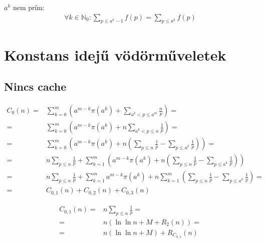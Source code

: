 \documentclass{article}
\begin{document}
$a^k$ nem prím:
\begin{align*}
\forall k \in \mathbb{N}_0 : \sum_{p \le a^k - 1} f(p) =\sum_{p \le a^k} f(p)
\end{align*}

\section{Konstans idejű vödörműveletek}

\subsection{Nincs cache}

\begin{align*}
C_0(n) =& \sum_{k=0}^{m} \left( a^{m-k} \pi(a^k) + \sum_{a^k < p \le a^m} \frac{n}{p} \right) = \\
=& \sum_{k=0}^{m} \left( a^{m-k} \pi(a^k) + n \sum_{a^k < p \le n} \frac{1}{p} \right) = \\
=& \sum_{k=0}^{m} \left( a^{m-k} \pi(a^k) + n \left( \sum_{p \le n} \frac{1}{p} - \sum_{p \le a^k} \frac{1}{p} \right) \right) = \\
=& n \sum_{p \le n} \frac{1}{p} + \sum_{k=1}^{m} \left( a^{m-k} \pi(a^k) + n \left( \sum_{p \le n} \frac{1}{p} - \sum_{p \le a^k} \frac{1}{p} \right) \right) \\
=& n \sum_{p \le n} \frac{1}{p} + \sum_{k=1}^{m} a^{m-k} \pi(a^k) + n \sum_{k=1}^{m} \left( \sum_{p \le n} \frac{1}{p} - \sum_{p \le a^k} \frac{1}{p} \right) = \\
=& C_{0,1}(n) + C_{0,2}(n) + C_{0,3}(n)
\end{align*}

\begin{align*}
C_{0,1}(n) =& n \sum_{p \le n} \frac{1}{p} = \\
=& n \left( \ln{\ln{n}} + M + R_2(n) \right) = \\
=& n \left( \ln{\ln{n}} + M \right) + R_{C_{0,1}}(n)
\end{align*}
\end{document}

